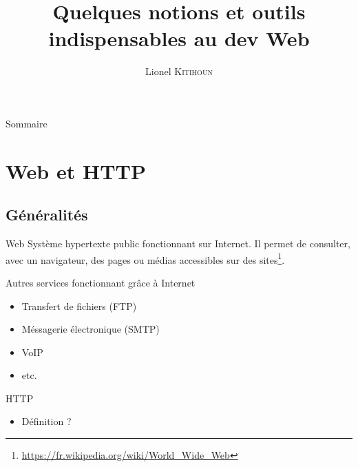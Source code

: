\documentclass{beamer}
\title{Quelques notions et outils indispensables au dev Web}
\date{}
\author{Lionel \textsc{Kitihoun}}
\begin{document}
\begin{frame}[plain]
\maketitle
\end{frame}

\begin{frame}{Sommaire}
\tableofcontents
\end{frame}

\section{Web et HTTP}
\subsection{Généralités}

\begin{frame}{Web}
Système hypertexte public fonctionnant sur Internet. Il permet de consulter, avec un navigateur, des pages ou médias accessibles sur des sites\footnote{\url{https://fr.wikipedia.org/wiki/World\_Wide\_Web}}.
\end{frame}

\begin{frame}{Autres services fonctionnant grâce à Internet}
\begin{itemize}
  \item Transfert de fichiers (FTP)
  \item Méssagerie électronique (SMTP)
  \item VoIP
  \item etc.
\end{itemize}
\end{frame}

\begin{frame}{HTTP}
\begin{itemize}
  \item Définition ?
\end{itemize}
\end{frame}
\end{document}

